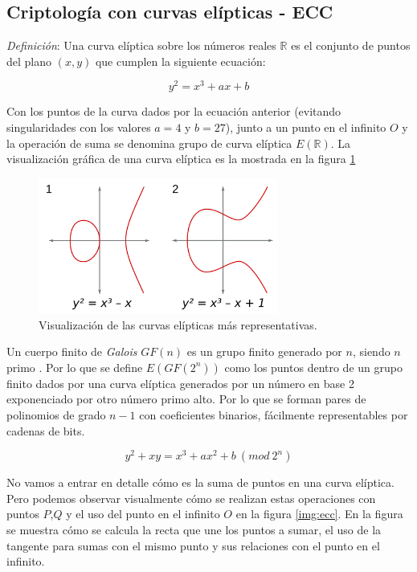 \documentclass[../PFC.tex]{subfiles}
\begin{document}
\subsection{Criptología con curvas elípticas - ECC}
\label{Criptología con curvas elípticas - ECC}

\textit{Definición}: Una curva elíptica sobre los números reales $\mathbb{R}$ es el conjunto de puntos del plano $(x , y)$ que cumplen la siguiente ecuación\cite{bruce}:

\begin{equation}
y^2 = x^3 + ax + b
\end{equation}

Con los puntos de la curva dados por la ecuación anterior (evitando singularidades con los valores $a = 4$ y $b = 27$), junto a un punto en el infinito $O$ y la operación de suma se denomina grupo de curva elíptica $E(\mathbb{R})$. La visualización gráfica de una curva elíptica es la mostrada en la figura \ref{img:ec}

\begin{figure}[H]
  \centering
  \includegraphics[width=0.7\textwidth]{./img/EC}
  \caption{Visualización de las curvas elípticas más representativas.}
  \label{img:ec}
\end{figure}

Un cuerpo finito de \textit{Galois} $GF(n)$ es un grupo finito generado por $n$, siendo $n$ primo \cite{lucena}. Por lo que se define $E(GF(2^n))$ como los puntos dentro de un grupo finito dados por una curva elíptica generados por un número en base 2 exponenciado por otro número primo alto. Por lo que se forman pares de polinomios de grado $n-1$ con coeficientes binarios, fácilmente representables por cadenas de bits\cite{lucena}.

\begin{equation}
y^2 + xy = x^3 + ax^2 + b\ (mod\ 2^n)
\end{equation}

No vamos a entrar en detalle cómo es la suma de puntos en una curva elíptica. Pero podemos observar visualmente cómo se realizan estas operaciones con puntos $P$,$Q$ y el uso del punto en el infinito $O$ en la figura \ref{img:ecc}. En la figura se muestra cómo se calcula la recta que une los puntos a sumar, el uso de la tangente para sumas con el mismo punto y sus relaciones con el punto en el infinito.
\end{document}
